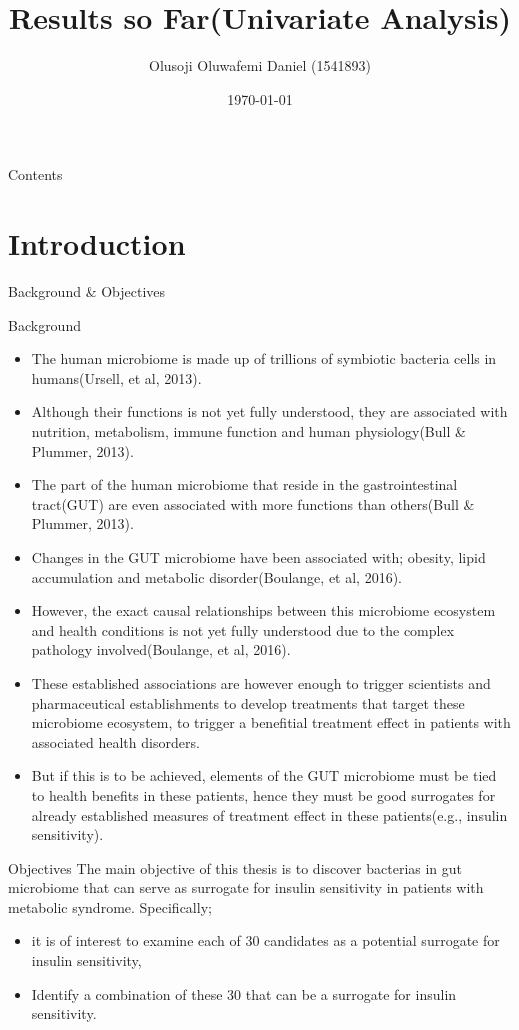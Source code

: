 \documentclass[a4paper,9pt]{beamer}\usepackage[]{graphicx}\usepackage[]{color}
\title{Results so Far(Univariate Analysis)}
\author{Olusoji Oluwafemi Daniel (1541893)}
\institute{Hasselt University, Belgium}
\date{\today}
\begin{document}
\begin{frame}
\titlepage
\end{frame}

\begin{frame}{Contents}
\tableofcontents
\end{frame}

\section{Introduction}
\begin{frame}{Background \& Objectives}
\tiny
\begin{block}{Background}
\begin{itemize}
\item The human microbiome is made up of trillions of symbiotic bacteria cells in humans(Ursell, et al, 2013).
\item Although their functions is not yet fully understood, they are associated with nutrition, metabolism, immune function and human physiology(Bull \& Plummer, 2013).
\item The part of the human microbiome that reside in the gastrointestinal tract(GUT) are even associated with more functions than others(Bull \& Plummer, 2013).
\item Changes in the GUT microbiome have been associated with; obesity, lipid accumulation and metabolic disorder(Boulange, et al, 2016). 
\item However, the exact causal relationships between this microbiome ecosystem and health conditions is not yet fully understood due to the complex pathology involved(Boulange, et al, 2016).
\item These established associations are however enough to trigger scientists and pharmaceutical establishments to develop treatments that target these microbiome ecosystem, to trigger a benefitial treatment effect in patients with associated health disorders.
\item But if this is to be achieved, elements of the GUT microbiome must be tied to health benefits in these patients, hence they must be good surrogates for already established measures of treatment effect in these patients(e.g., insulin sensitivity).
\end{itemize}
\end{block}

\begin{block}{Objectives}
The main objective of this thesis is to discover bacterias in gut microbiome that can serve as surrogate for insulin sensitivity in patients with metabolic syndrome.  Specifically;
\begin{itemize}
\item it is of interest to examine each of 30 candidates as a potential surrogate for insulin sensitivity,
\item Identify a combination of these 30 that can be a surrogate for insulin sensitivity.
\end{itemize}
\end{block}
\end{frame}
\end{document}
